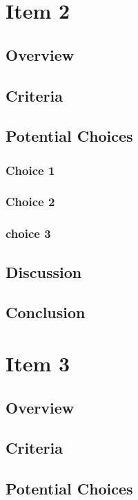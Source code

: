 \documentclass[letterpaper,10pt]{article}
\begin{document}
	
\section{Item 2}
		\subsection{Overview}
	
	\subsection{Criteria}
	
	\subsection{Potential Choices}
		\subsubsection{Choice 1}
		
		\subsubsection{Choice 2}
		
		\subsubsection{choice 3}
		
	\subsection{Discussion}
	
	\subsection{Conclusion}
	
	
\section{Item 3}
		\subsection{Overview}
	
	\subsection{Criteria}
	
	\subsection{Potential Choices}
\end{document}
